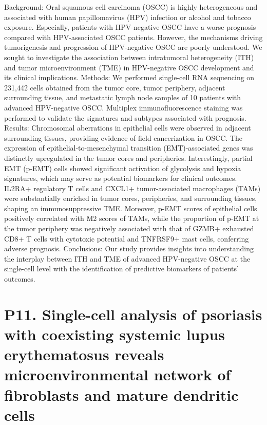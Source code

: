 \noindent
Background: Oral squamous cell carcinoma (OSCC) is highly heterogeneous and associated with human papillomavirus (HPV) infection or alcohol and tobacco exposure. Especially, patients with HPV-negative OSCC have a worse prognosis compared with HPV-associated OSCC patients. However, the mechanisms driving tumorigenesis and progression of HPV-negative OSCC are poorly understood. We sought to investigate the association between intratumoral heterogeneity (ITH) and tumor microenvironment (TME) in HPV-negative OSCC development and its clinical implications.
Methods: We performed single-cell RNA sequencing on 231,442 cells obtained from the tumor core, tumor periphery, adjacent surrounding tissue, and metastatic lymph node samples of 10 patients with advanced HPV-negative OSCC. Multiplex immunofluorescence staining was performed to validate the signatures and subtypes associated with prognosis.
Results: Chromosomal aberrations in epithelial cells were observed in adjacent surrounding tissues, providing evidence of field cancerization in OSCC. The expression of epithelial-to-mesenchymal transition (EMT)-associated genes was distinctly upregulated in the tumor cores and peripheries. Interestingly, partial EMT (p-EMT) cells showed significant activation of glycolysis and hypoxia signatures, which may serve as potential biomarkers for clinical outcomes. IL2RA+ regulatory T cells and CXCL1+ tumor-associated macrophages (TAMs) were substantially enriched in tumor cores, peripheries, and surrounding tissues, shaping an immunosuppressive TME. Moreover, p-EMT scores of epithelial cells positively correlated with M2 scores of TAMs, while the proportion of p-EMT at the tumor periphery was negatively associated with that of GZMB+ exhausted CD8+ T cells with cytotoxic potential and TNFRSF9+ mast cells, conferring adverse prognosis.
Conclusions: Our study provides insights into understanding the interplay between ITH and TME of advanced HPV-negative OSCC at the single-cell level with the identification of predictive biomarkers of patients’ outcomes.
\newpage


\section*{P11. Single-cell analysis of psoriasis with coexisting systemic lupus erythematosus reveals microenvironmental network of fibroblasts and mature dendritic cells}

